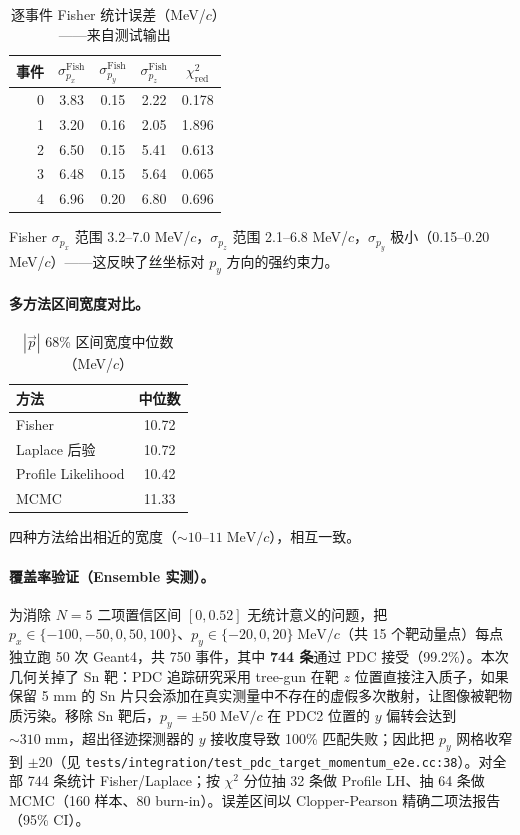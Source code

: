 \documentclass[a4paper, 11pt]{article}
\begin{document}
\begin{table}[H]
\centering
\caption{逐事件 Fisher 统计误差（MeV/$c$）——来自测试输出}
\label{tab:fisher}
\begin{tabular}{rcccc}
\toprule
事件 & $\sigma_{p_x}^\mathrm{Fish}$ & $\sigma_{p_y}^\mathrm{Fish}$ & $\sigma_{p_z}^\mathrm{Fish}$ & $\chi^2_\mathrm{red}$ \\
\midrule
0 & 3.83 & 0.15 & 2.22 & 0.178 \\
1 & 3.20 & 0.16 & 2.05 & 1.896 \\
2 & 6.50 & 0.15 & 5.41 & 0.613 \\
3 & 6.48 & 0.15 & 5.64 & 0.065 \\
4 & 6.96 & 0.20 & 6.80 & 0.696 \\
\bottomrule
\end{tabular}
\end{table}

Fisher $\sigma_{p_x}$ 范围 3.2--7.0 MeV/$c$，$\sigma_{p_z}$ 范围 2.1--6.8 MeV/$c$，$\sigma_{p_y}$ 极小（0.15--0.20 MeV/$c$）——这反映了丝坐标对 $p_y$ 方向的强约束力。

\paragraph{多方法区间宽度对比。}

\begin{table}[H]
\centering
\caption{$|\vec{p}|$ 68\% 区间宽度中位数（MeV/$c$）}
\begin{tabular}{lc}
\toprule
方法 & 中位数 \\
\midrule
Fisher & 10.72 \\
Laplace 后验 & 10.72 \\
Profile Likelihood & 10.42 \\
MCMC & 11.33 \\
\bottomrule
\end{tabular}
\end{table}

四种方法给出相近的宽度（$\sim 10\text{--}11\;\mathrm{MeV}/c$），相互一致。

\paragraph{覆盖率验证（Ensemble 实测）。}

为消除 $N=5$ 二项置信区间 $[0,0.52]$ 无统计意义的问题，把 $p_x\in\{-100,-50,0,50,100\}$、$p_y\in\{-20,0,20\}\;\mathrm{MeV}/c$（共 15 个靶动量点）每点独立跑 50 次 Geant4，共 750 事件，其中 \textbf{744 条}通过 PDC 接受（99.2\%）。本次几何关掉了 Sn 靶：PDC 追踪研究采用 tree-gun 在靶 $z$ 位置直接注入质子，如果保留 5 mm 的 Sn 片只会添加在真实测量中不存在的虚假多次散射，让图像被靶物质污染。移除 Sn 靶后，$p_y{=}\pm 50\;\mathrm{MeV}/c$ 在 PDC2 位置的 $y$ 偏转会达到 $\sim 310\;\mathrm{mm}$，超出径迹探测器的 $y$ 接收度导致 100\% 匹配失败；因此把 $p_y$ 网格收窄到 $\pm 20$（见 \texttt{tests/integration/test\_pdc\_target\_momentum\_e2e.cc:38}）。对全部 744 条统计 Fisher/Laplace；按 $\chi^2$ 分位抽 32 条做 Profile LH、抽 64 条做 MCMC（160 样本、80 burn-in）。误差区间以 Clopper-Pearson 精确二项法报告（95\% CI）。
\end{document}
